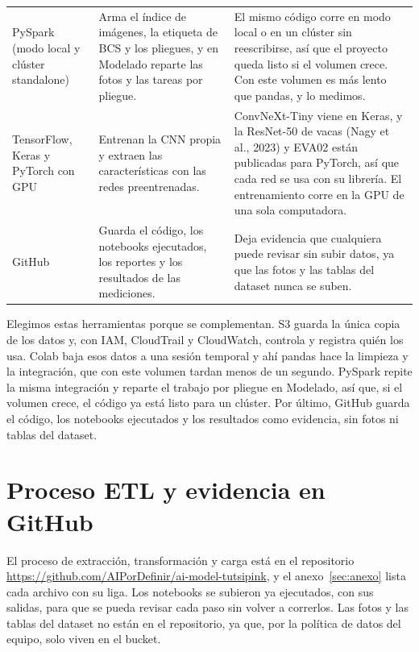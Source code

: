 \documentclass[11pt,letterpaper,DIV=12]{scrartcl}
\begin{document}
{\begin{xltabular}{\textwidth}{>{\raggedright\arraybackslash}p{0.17\textwidth}>{\raggedright\arraybackslash}X>{\raggedright\arraybackslash}X}
  \addlinespace
  PySpark (modo local y clúster standalone) & Arma el índice de imágenes, la etiqueta de BCS y los pliegues, y en Modelado reparte las fotos y las tareas por pliegue. & El mismo código corre en modo local o en un clúster sin reescribirse, así que el proyecto queda listo si el volumen crece. Con este volumen es más lento que pandas, y lo medimos. \\
  \addlinespace
  TensorFlow, Keras y PyTorch con GPU & Entrenan la CNN propia y extraen las características con las redes preentrenadas. & ConvNeXt-Tiny viene en Keras, y la ResNet-50 de vacas (Nagy et al., 2023) y EVA02 están publicadas para PyTorch, así que cada red se usa con su librería. El entrenamiento corre en la GPU de una sola computadora. \\
  \addlinespace
  GitHub & Guarda el código, los notebooks ejecutados, los reportes y los resultados de las mediciones. & Deja evidencia que cualquiera puede revisar sin subir datos, ya que las fotos y las tablas del dataset nunca se suben. \\
\end{xltabular}
}

Elegimos estas herramientas porque se complementan. S3 guarda la única copia de los datos y, con IAM, CloudTrail y CloudWatch, controla y registra quién los usa. Colab baja esos datos a una sesión temporal y ahí pandas hace la limpieza y la integración, que con este volumen tardan menos de un segundo. PySpark repite la misma integración y reparte el trabajo por pliegue en Modelado, así que, si el volumen crece, el código ya está listo para un clúster. Por último, GitHub guarda el código, los notebooks ejecutados y los resultados como evidencia, sin fotos ni tablas del dataset.

\section{Proceso ETL y evidencia en GitHub}\label{sec:etl}

El proceso de extracción, transformación y carga está en el repositorio \url{https://github.com/AIPorDefinir/ai-model-tutsipink}, y el anexo~\ref{sec:anexo} lista cada archivo con su liga. Los notebooks se subieron ya ejecutados, con sus salidas, para que se pueda revisar cada paso sin volver a correrlos. Las fotos y las tablas del dataset no están en el repositorio, ya que, por la política de datos del equipo, solo viven en el bucket.
\end{document}

